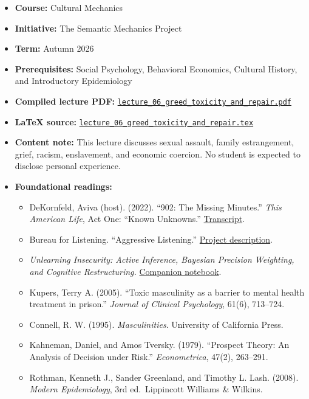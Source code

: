 \documentclass[
  11pt,
  letterpaper,
]{article}
\providecommand{\tightlist}{%
  \setlength{\itemsep}{0pt}\setlength{\parskip}{0pt}}
\begin{document}
\begin{itemize}
\tightlist
\item
  \textbf{Course:} Cultural Mechanics
\item
  \textbf{Initiative:} The Semantic Mechanics Project
\item
  \textbf{Term:} Autumn 2026
\item
  \textbf{Prerequisites:} Social Psychology, Behavioral Economics,
  Cultural History, and Introductory Epidemiology
\item
  \textbf{Compiled lecture PDF:}
  \href{lecture_06_greed_toxicity_and_repair.pdf}{\texttt{lecture\_06\_greed\_toxicity\_and\_repair.pdf}}
\item
  \textbf{LaTeX source:}
  \href{lecture_06_greed_toxicity_and_repair.tex}{\texttt{lecture\_06\_greed\_toxicity\_and\_repair.tex}}
\item
  \textbf{Content note:} This lecture discusses sexual assault, family
  estrangement, grief, racism, enslavement, and economic coercion. No
  student is expected to disclose personal experience.
\item
  \textbf{Foundational readings:}

  \begin{itemize}
  \tightlist
  \item
    DeKornfeld, Aviva (host). (2022). ``902: The Missing Minutes.''
    \emph{This American Life}, Act One: ``Known Unknowns.''
    \href{https://www.thisamericanlife.org/902/transcript}{Transcript}.
  \item
    Bureau for Listening. ``Aggressive Listening.''
    \href{https://bureauforlistening.com/agressive-listening/}{Project
    description}.
  \item
    \emph{Unlearning Insecurity: Active Inference, Bayesian Precision
    Weighting, and Cognitive Restructuring.}
    \href{../../../hpc/chaoshearing/notebooks/unlearning_insecurity_active_inference.ipynb}{Companion
    notebook}.
  \item
    Kupers, Terry A. (2005). ``Toxic masculinity as a barrier to mental
    health treatment in prison.'' \emph{Journal of Clinical Psychology},
    61(6), 713--724.
  \item
    Connell, R. W. (1995). \emph{Masculinities}. University of
    California Press.
  \item
    Kahneman, Daniel, and Amos Tversky. (1979). ``Prospect Theory: An
    Analysis of Decision under Risk.'' \emph{Econometrica}, 47(2),
    263--291.
  \item
    Rothman, Kenneth J., Sander Greenland, and Timothy L. Lash. (2008).
    \emph{Modern Epidemiology}, 3rd ed.~Lippincott Williams \& Wilkins.
  \end{itemize}
\end{itemize}
\end{document}
